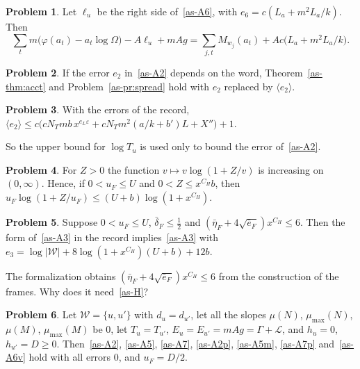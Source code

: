 \documentclass[reqno]{amsart}
\theoremstyle{definition}
\newtheorem{problem}{Problem}[section]
\theoremstyle{plain}
\newcommand{\Lc}{\mathcal{L}}
\newcommand{\Wc}{\mathcal{W}}
\newcommand{\mumax}{\mu_{\max}}
\begin{document}
\begin{problem}\label{pr:key}
Let \(\ell_u\) be the right side of~\eqref{as-A6}, with \(e_6 = c(L_a + m^2L_a/k)\).  Then
\[
  \sum_t m\bigl(\varphi(a_t) - a_t\log\Omega\bigr) - A\ell_u + mAg = \sum_{j,t} M_{w_j}(a_t) + Ac\bigl(L_a + m^2L_a/k\bigr) .
\]
\end{problem}

\begin{problem}\label{pr:word-mean}
If the error \(e_2\) in~\eqref{as-A2} depends on the word, Theorem~\ref{as-thm:acct} and Problem~\ref{as-pr:spread} hold with \(e_2\) replaced by \(\langle e_2\rangle\).
\end{problem}

\begin{problem}\label{pr:Lo}
With the errors of the record, \(\langle e_2\rangle \le c\bigl(cN_Tmb\,x^{e_L\varepsilon} + cN_Tm^2(a/k + b')L + X''\bigr) + 1\).
\end{problem}

So the upper bound for \(\log T_u\) is used only to bound the error of~\eqref{as-A2}.

\begin{problem}\label{pr:phi}
For \(Z > 0\) the function \(v \mapsto v\log(1 + Z/v)\) is increasing on \((0, \infty)\).  Hence, if \(0 < u_F \le U\) and \(0 < Z \le x^{C_H}b\), then \(u_F\log(1 + Z/u_F) \le (U + b)\log(1 + x^{C_H})\).
\end{problem}

\begin{problem}\label{pr:e3-raw}
Suppose \(0 < u_F \le U\), \(\bar\delta_F \le \frac12\) and \((\bar\eta_F + 4\sqrt{\bar e_F})x^{C_H} \le 6\).  Then the form of~\eqref{as-A3} in the record implies~\eqref{as-A3} with \(e_3 = \log\lvert\Wc\rvert + 8\log(1 + x^{C_H})(U + b) + 12b\).
\end{problem}

The formalization obtains \((\bar\eta_F + 4\sqrt{\bar e_F})x^{C_H} \le 6\) from the construction of the frames.  Why does it need~\eqref{as-H}?

\begin{problem}\label{pr:H-needed}
Let \(\Wc = \{u, u'\}\) with \(d_u = d_{u'}\), let all the slopes \(\mu(N)\), \(\mumax(N)\), \(\mu(M)\), \(\mumax(M)\) be \(0\), let \(T_u = T_{u'}\), \(E_u = E_{u'} = mAg = \Gamma + \Lc\), and \(h_u = 0\), \(h_{u'} = D \ge 0\).  Then~\eqref{as-A2}, \eqref{as-A5}, \eqref{as-A7}, \eqref{as-A2p}, \eqref{as-A5m}, \eqref{as-A7p} and~\eqref{as-A6v} hold with all errors \(0\), and \(u_F = D/2\).
\end{problem}
\end{document}
